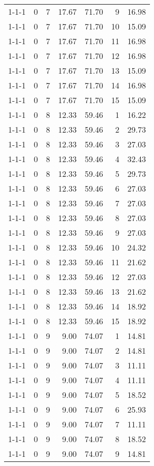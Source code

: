 \begin{tabular}{lrrrrrr}
1-1-1 & 0 & 7 & 17.67 & 71.70 & 9 & 16.98 \\
1-1-1 & 0 & 7 & 17.67 & 71.70 & 10 & 15.09 \\
1-1-1 & 0 & 7 & 17.67 & 71.70 & 11 & 16.98 \\
1-1-1 & 0 & 7 & 17.67 & 71.70 & 12 & 16.98 \\
1-1-1 & 0 & 7 & 17.67 & 71.70 & 13 & 15.09 \\
1-1-1 & 0 & 7 & 17.67 & 71.70 & 14 & 16.98 \\
1-1-1 & 0 & 7 & 17.67 & 71.70 & 15 & 15.09 \\
1-1-1 & 0 & 8 & 12.33 & 59.46 & 1 & 16.22 \\
1-1-1 & 0 & 8 & 12.33 & 59.46 & 2 & 29.73 \\
1-1-1 & 0 & 8 & 12.33 & 59.46 & 3 & 27.03 \\
1-1-1 & 0 & 8 & 12.33 & 59.46 & 4 & 32.43 \\
1-1-1 & 0 & 8 & 12.33 & 59.46 & 5 & 29.73 \\
1-1-1 & 0 & 8 & 12.33 & 59.46 & 6 & 27.03 \\
1-1-1 & 0 & 8 & 12.33 & 59.46 & 7 & 27.03 \\
1-1-1 & 0 & 8 & 12.33 & 59.46 & 8 & 27.03 \\
1-1-1 & 0 & 8 & 12.33 & 59.46 & 9 & 27.03 \\
1-1-1 & 0 & 8 & 12.33 & 59.46 & 10 & 24.32 \\
1-1-1 & 0 & 8 & 12.33 & 59.46 & 11 & 21.62 \\
1-1-1 & 0 & 8 & 12.33 & 59.46 & 12 & 27.03 \\
1-1-1 & 0 & 8 & 12.33 & 59.46 & 13 & 21.62 \\
1-1-1 & 0 & 8 & 12.33 & 59.46 & 14 & 18.92 \\
1-1-1 & 0 & 8 & 12.33 & 59.46 & 15 & 18.92 \\
1-1-1 & 0 & 9 & 9.00 & 74.07 & 1 & 14.81 \\
1-1-1 & 0 & 9 & 9.00 & 74.07 & 2 & 14.81 \\
1-1-1 & 0 & 9 & 9.00 & 74.07 & 3 & 11.11 \\
1-1-1 & 0 & 9 & 9.00 & 74.07 & 4 & 11.11 \\
1-1-1 & 0 & 9 & 9.00 & 74.07 & 5 & 18.52 \\
1-1-1 & 0 & 9 & 9.00 & 74.07 & 6 & 25.93 \\
1-1-1 & 0 & 9 & 9.00 & 74.07 & 7 & 11.11 \\
1-1-1 & 0 & 9 & 9.00 & 74.07 & 8 & 18.52 \\
1-1-1 & 0 & 9 & 9.00 & 74.07 & 9 & 14.81 \\

\end{tabular}
